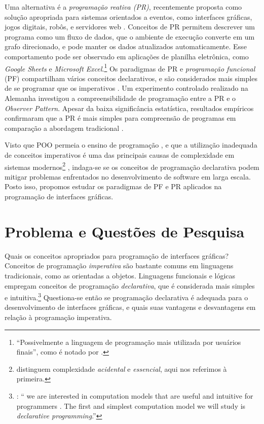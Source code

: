Uma alternativa é a \emph{programação reativa (PR)}, recentemente proposta como
solução apropriada para sistemas orientados a eventos, como interfaces gráficas,
jogos digitais, robôs, e servidores web \cite{salvaneschi2015,bainomugisha2013}.
Conceitos de PR permitem descrever um programa como um fluxo de dados, que o
ambiente de execução converte em um grafo direcionado, e pode manter os dados
atualizados automaticamente.
Esse comportamento pode ser observado em aplicações de planilha eletrônica, como
\emph{Google Sheets} e \emph{Microsoft Excel}.\footnote{“Possivelmente a linguagem de programação mais utilizada por
usuários finais”, como é notado por \textcite[p. 2]{bainomugisha2013}.}
Os paradigmas de PR e \emph{programação funcional} (PF) compartilham vários conceitos
declarativos, e são considerados mais simples de se programar que os imperativos
\cite{blackheath2016,bainomugisha2013}.
Um experimento controlado realizado na Alemanha investigou a compreensibilidade
de programação entre a PR e o \emph{Observer Pattern}.
Apesar da baixa significância estatística, resultados empíricos confirmaram que
a PR é mais simples para compreensão de programas em comparação a abordagem
tradicional \cite{salvaneschi2014}.

Visto que POO permeia o ensino de programação \cite{vanroy2003}, e que a
utilização inadequada de conceitos imperativos é uma das principais causas de
complexidade em sistemas modernos\footnote{\textcite{moseley2006} distinguem complexidade \emph{acidental} e
\emph{essencial}, aqui nos referimos à primeira.} \cite{moseley2006}, indaga-se se
os conceitos de programação declarativa podem mitigar problemas enfrentados no
desenvolvimento de software em larga escala.
Posto isso, propomos estudar os paradigmas de PF e PR aplicados na programação
de interfaces gráficas.

\section{Problema e Questões de Pesquisa}
\label{sec:orga3ccd98}
Quais os conceitos apropriados para programação de interfaces gráficas?
Conceitos de programação \emph{imperativa} são bastante comuns em linguagens
tradicionais, como as orientadas a objetos.
Linguagens funcionais e lógicas empregam conceitos de programação
\emph{declarativa}, que é considerada mais simples e intuitiva.\footnote{\textcite[p. 31]{roy2004}: “\textelp{} we are interested in
computation models that are useful and intuitive for programmers \textelp{}. The
first and simplest computation model we will study is \emph{declarative
programming}.”}
Questiona-se então se programação declarativa é adequada para o
desenvolvimento de interfaces gráficas, e quais suas vantagens e desvantagens
em relação à programação imperativa.

